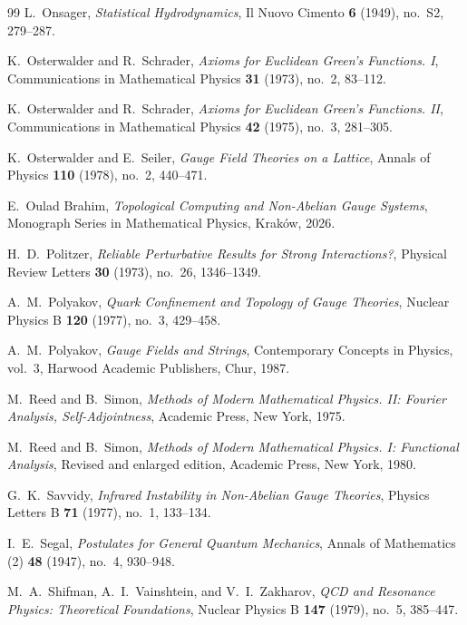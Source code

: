 \begin{thebibliography}{99}
L.~Onsager,
\textit{Statistical Hydrodynamics},
Il Nuovo Cimento \textbf{6} (1949), no.~S2, 279--287.

K.~Osterwalder and R.~Schrader,
\textit{Axioms for Euclidean Green's Functions. I},
Communications in Mathematical Physics \textbf{31} (1973), no.~2, 83--112.

K.~Osterwalder and R.~Schrader,
\textit{Axioms for Euclidean Green's Functions. II},
Communications in Mathematical Physics \textbf{42} (1975), no.~3, 281--305.

K.~Osterwalder and E.~Seiler,
\textit{Gauge Field Theories on a Lattice},
Annals of Physics \textbf{110} (1978), no.~2, 440--471.

E.~Oulad Brahim,
\textit{Topological Computing and Non-Abelian Gauge Systems},
Monograph Series in Mathematical Physics, Krak\'ow, 2026.

H.~D.~Politzer,
\textit{Reliable Perturbative Results for Strong Interactions?},
Physical Review Letters \textbf{30} (1973), no.~26, 1346--1349.

A.~M.~Polyakov,
\textit{Quark Confinement and Topology of Gauge Theories},
Nuclear Physics B \textbf{120} (1977), no.~3, 429--458.

A.~M.~Polyakov,
\textit{Gauge Fields and Strings},
Contemporary Concepts in Physics, vol.~3, Harwood Academic Publishers, Chur, 1987.

M.~Reed and B.~Simon,
\textit{Methods of Modern Mathematical Physics. II: Fourier Analysis, Self-Adjointness},
Academic Press, New York, 1975.

M.~Reed and B.~Simon,
\textit{Methods of Modern Mathematical Physics. I: Functional Analysis},
Revised and enlarged edition, Academic Press, New York, 1980.

G.~K.~Savvidy,
\textit{Infrared Instability in Non-Abelian Gauge Theories},
Physics Letters B \textbf{71} (1977), no.~1, 133--134.

I.~E.~Segal,
\textit{Postulates for General Quantum Mechanics},
Annals of Mathematics (2) \textbf{48} (1947), no.~4, 930--948.

M.~A.~Shifman, A.~I.~Vainshtein, and V.~I.~Zakharov,
\textit{QCD and Resonance Physics: Theoretical Foundations},
Nuclear Physics B \textbf{147} (1979), no.~5, 385--447.


\end{thebibliography}
